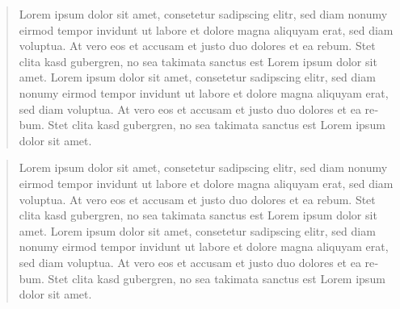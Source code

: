 
\vspace*{40pt}

\begin{otherlanguage}{ngerman}
\begin{minipage}{\textwidth}
	\begin{abstract}
		\thispagestyle{hsos-logo-and-foot-with-page}

		Lorem ipsum dolor sit amet, consetetur sadipscing elitr, sed diam nonumy eirmod tempor invidunt ut labore et dolore magna aliquyam erat, sed diam voluptua. At vero eos et accusam et justo duo dolores et ea rebum. Stet clita kasd gubergren, no sea takimata sanctus est Lorem ipsum dolor sit amet. Lorem ipsum dolor sit amet, consetetur sadipscing elitr, sed diam nonumy eirmod tempor invidunt ut labore et dolore magna aliquyam erat, sed diam voluptua. At vero eos et accusam et justo duo dolores et ea rebum. Stet clita kasd gubergren, no sea takimata sanctus est Lorem ipsum dolor sit amet.
		
	\end{abstract}
\end{minipage}
\end{otherlanguage}

\begin{otherlanguage}{english}
\begin{minipage}{\textwidth}
	\begin{abstract}
		\thispagestyle{hsos-logo-and-foot-with-page}
		
		Lorem ipsum dolor sit amet, consetetur sadipscing elitr, sed diam nonumy eirmod tempor invidunt ut labore et dolore magna aliquyam erat, sed diam voluptua. At vero eos et accusam et justo duo dolores et ea rebum. Stet clita kasd gubergren, no sea takimata sanctus est Lorem ipsum dolor sit amet. Lorem ipsum dolor sit amet, consetetur sadipscing elitr, sed diam nonumy eirmod tempor invidunt ut labore et dolore magna aliquyam erat, sed diam voluptua. At vero eos et accusam et justo duo dolores et ea rebum. Stet clita kasd gubergren, no sea takimata sanctus est Lorem ipsum dolor sit amet.
		
	\end{abstract}
\end{minipage}
\end{otherlanguage}
\vfill